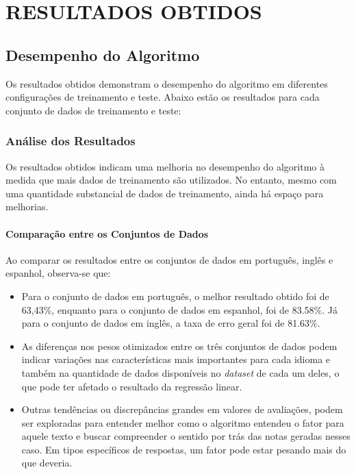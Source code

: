 \chapter{RESULTADOS OBTIDOS}

\section{Desempenho do Algoritmo}

Os resultados obtidos demonstram o desempenho do algoritmo em diferentes configurações de treinamento e teste. Abaixo estão os resultados para cada conjunto de dados de treinamento e teste:










\newpage

\subsection{Análise dos Resultados}

Os resultados obtidos indicam uma melhoria no desempenho do algoritmo à medida que mais dados de treinamento são utilizados. No entanto, mesmo com uma quantidade substancial de dados de treinamento, ainda há espaço para melhorias.

\subsubsection{Comparação entre os Conjuntos de Dados}

Ao comparar os resultados entre os conjuntos de dados em português, inglês e espanhol, observa-se que:

\begin{itemize}
    \item Para o conjunto de dados em português, o melhor resultado obtido foi de 63,43\%, enquanto para o conjunto de dados em espanhol, foi de 83.58\%. Já para o conjunto de dados em inglês, a taxa de erro geral foi de 81.63\%.
    \item As diferenças nos pesos otimizados entre os três conjuntos de dados podem indicar variações nas características mais importantes para cada idioma e também na quantidade de dados disponíveis no \textit{dataset} de cada um deles, o que pode ter afetado o resultado da regressão linear.
    \item Outras tendências ou discrepâncias grandes em valores de avaliações, podem ser exploradas para entender melhor como o algoritmo entendeu o fator para aquele texto e buscar compreender o sentido por trás das notas geradas nesses caso. Em tipos específicos de respostas, um fator pode estar pesando mais do que deveria. 
\end{itemize}

